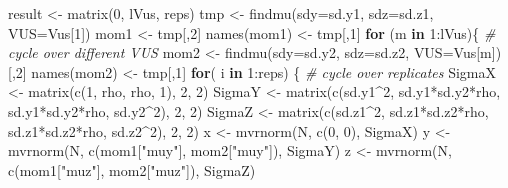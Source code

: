 \documentclass[
]{article}
\newenvironment{Shaded}{\begin{snugshade}}{\end{snugshade}}
\newcommand{\AttributeTok}[1]{\textcolor[rgb]{0.77,0.63,0.00}{#1}}
\newcommand{\CommentTok}[1]{\textcolor[rgb]{0.56,0.35,0.01}{\textit{#1}}}
\newcommand{\ControlFlowTok}[1]{\textcolor[rgb]{0.13,0.29,0.53}{\textbf{#1}}}
\newcommand{\DecValTok}[1]{\textcolor[rgb]{0.00,0.00,0.81}{#1}}
\newcommand{\FunctionTok}[1]{\textcolor[rgb]{0.00,0.00,0.00}{#1}}
\newcommand{\NormalTok}[1]{#1}
\newcommand{\OtherTok}[1]{\textcolor[rgb]{0.56,0.35,0.01}{#1}}
\newcommand{\SpecialCharTok}[1]{\textcolor[rgb]{0.00,0.00,0.00}{#1}}
\newcommand{\StringTok}[1]{\textcolor[rgb]{0.31,0.60,0.02}{#1}}
\begin{document}
\begin{Shaded}
\begin{Highlighting}[]
\NormalTok{result }\OtherTok{\textless{}{-}} \FunctionTok{matrix}\NormalTok{(}\DecValTok{0}\NormalTok{, lVus, reps)}
\NormalTok{tmp }\OtherTok{\textless{}{-}} \FunctionTok{findmu}\NormalTok{(}\AttributeTok{sdy=}\NormalTok{sd.y1, }\AttributeTok{sdz=}\NormalTok{sd.z1, }\AttributeTok{VUS=}\NormalTok{Vus[}\DecValTok{1}\NormalTok{])}
\NormalTok{mom1 }\OtherTok{\textless{}{-}}\NormalTok{ tmp[,}\DecValTok{2}\NormalTok{]}
\FunctionTok{names}\NormalTok{(mom1) }\OtherTok{\textless{}{-}}\NormalTok{ tmp[,}\DecValTok{1}\NormalTok{]}
\ControlFlowTok{for}\NormalTok{ (m }\ControlFlowTok{in} \DecValTok{1}\SpecialCharTok{:}\NormalTok{lVus)\{            }\CommentTok{\# cycle over different VUS}
\NormalTok{  mom2 }\OtherTok{\textless{}{-}} \FunctionTok{findmu}\NormalTok{(}\AttributeTok{sdy=}\NormalTok{sd.y2, }\AttributeTok{sdz=}\NormalTok{sd.z2, }\AttributeTok{VUS=}\NormalTok{Vus[m])[,}\DecValTok{2}\NormalTok{]}
  \FunctionTok{names}\NormalTok{(mom2) }\OtherTok{\textless{}{-}}\NormalTok{ tmp[,}\DecValTok{1}\NormalTok{]}
  \ControlFlowTok{for}\NormalTok{( i }\ControlFlowTok{in} \DecValTok{1}\SpecialCharTok{:}\NormalTok{reps) \{         }\CommentTok{\# cycle over replicates}
\NormalTok{    SigmaX }\OtherTok{\textless{}{-}} \FunctionTok{matrix}\NormalTok{(}\FunctionTok{c}\NormalTok{(}\DecValTok{1}\NormalTok{, rho, rho, }\DecValTok{1}\NormalTok{), }\DecValTok{2}\NormalTok{, }\DecValTok{2}\NormalTok{)}
\NormalTok{    SigmaY }\OtherTok{\textless{}{-}} \FunctionTok{matrix}\NormalTok{(}\FunctionTok{c}\NormalTok{(sd.y1}\SpecialCharTok{\^{}}\DecValTok{2}\NormalTok{, sd.y1}\SpecialCharTok{*}\NormalTok{sd.y2}\SpecialCharTok{*}\NormalTok{rho,}
\NormalTok{                       sd.y1}\SpecialCharTok{*}\NormalTok{sd.y2}\SpecialCharTok{*}\NormalTok{rho, sd.y2}\SpecialCharTok{\^{}}\DecValTok{2}\NormalTok{), }\DecValTok{2}\NormalTok{, }\DecValTok{2}\NormalTok{)}
\NormalTok{    SigmaZ }\OtherTok{\textless{}{-}} \FunctionTok{matrix}\NormalTok{(}\FunctionTok{c}\NormalTok{(sd.z1}\SpecialCharTok{\^{}}\DecValTok{2}\NormalTok{, sd.z1}\SpecialCharTok{*}\NormalTok{sd.z2}\SpecialCharTok{*}\NormalTok{rho,}
\NormalTok{                       sd.z1}\SpecialCharTok{*}\NormalTok{sd.z2}\SpecialCharTok{*}\NormalTok{rho, sd.z2}\SpecialCharTok{\^{}}\DecValTok{2}\NormalTok{), }\DecValTok{2}\NormalTok{, }\DecValTok{2}\NormalTok{)}
\NormalTok{    x }\OtherTok{\textless{}{-}} \FunctionTok{mvrnorm}\NormalTok{(N, }\FunctionTok{c}\NormalTok{(}\DecValTok{0}\NormalTok{, }\DecValTok{0}\NormalTok{), SigmaX)}
\NormalTok{    y }\OtherTok{\textless{}{-}} \FunctionTok{mvrnorm}\NormalTok{(N, }\FunctionTok{c}\NormalTok{(mom1[}\StringTok{"muy"}\NormalTok{], mom2[}\StringTok{"muy"}\NormalTok{]), SigmaY)}
\NormalTok{    z }\OtherTok{\textless{}{-}} \FunctionTok{mvrnorm}\NormalTok{(N, }\FunctionTok{c}\NormalTok{(mom1[}\StringTok{"muz"}\NormalTok{], mom2[}\StringTok{"muz"}\NormalTok{]), SigmaZ)}


\end{Highlighting}
\end{Shaded}
\end{document}
